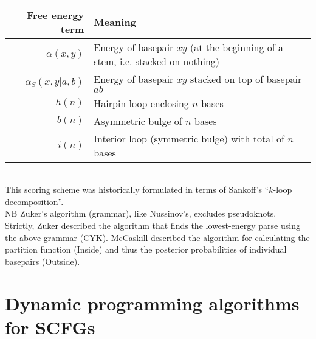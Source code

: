 \documentclass{beamer}
\begin{document}
\begin{frame}{}
\\
\begin{tabular}{rl}
Free energy term & Meaning \\
\hline
$\alpha(x,y)$ & Energy of basepair $xy$ (at the beginning of a stem, i.e. stacked on nothing) \\
$\alpha_S(x,y|a,b)$ & Energy of basepair $xy$ stacked on top of basepair $ab$ \\
$h(n)$ & Hairpin loop enclosing $n$ bases \\
$b(n)$ & Asymmetric bulge of $n$ bases \\
$i(n)$ & Interior loop (symmetric bulge) with total of $n$ bases
\end{tabular}
\\
This scoring scheme was historically formulated in terms of Sankoff's ``$k$-loop decomposition''.
\\
NB Zuker's algorithm (grammar), like Nussinov's, excludes pseudoknots.
\\
Strictly, Zuker described the algorithm that finds the lowest-energy parse using the above grammar (CYK).
McCaskill described the algorithm for calculating the partition function (Inside)
and thus the posterior probabilities of individual basepairs (Outside).
 \iteme
\iteme

\end{frame}

\section{Dynamic programming algorithms for SCFGs}
\end{document}
